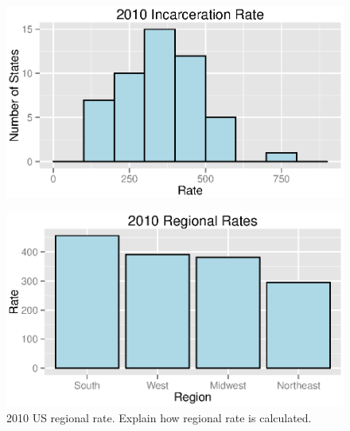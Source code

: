 \documentclass{exam}
\begin{document}
  \begin{figure}[H]
    \centering
    \includegraphics[scale = 0.9]{figures/rate_histogram_2010.eps}
  \end{figure}

  \begin{figure}[H]
    \centering
    \includegraphics[scale = 0.9]{figures/regional_rates_2010.eps}
    \caption{2010 US regional rate.  Explain how regional rate is calculated.}
  \end{figure}
\end{document}
